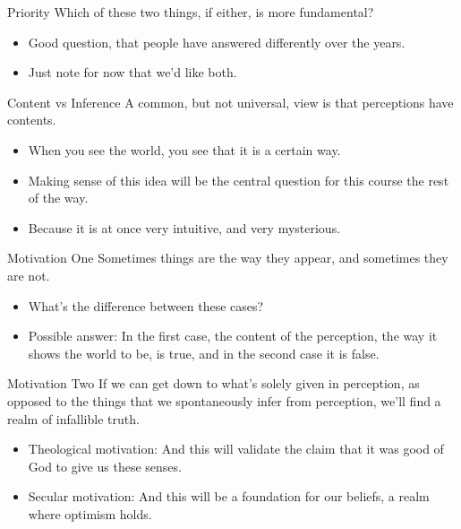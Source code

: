 \documentclass[
  17pt,
  letterpaper,
  ignorenonframetext,
  aspectratio=169,
  handout]{beamer}
\providecommand{\tightlist}{%
  \setlength{\itemsep}{0pt}\setlength{\parskip}{0pt}}\usepackage{longtable,booktabs,array}
\begin{document}
\begin{frame}{Priority}
\protect\hypertarget{priority}{}
Which of these two things, if either, is more fundamental?

\begin{itemize}[<+->]
\tightlist
\item
  Good question, that people have answered differently over the years.
\item
  Just note for now that we'd like both.
\end{itemize}
\end{frame}

\begin{frame}{Content vs Inference}
\protect\hypertarget{content-vs-inference}{}
A common, but not universal, view is that perceptions have contents.

\begin{itemize}[<+->]
\tightlist
\item
  When you see the world, you see that it is a certain way.
\item
  Making sense of this idea will be the central question for this course
  the rest of the way.
\item
  Because it is at once very intuitive, and very mysterious.
\end{itemize}
\end{frame}

\begin{frame}{Motivation One}
\protect\hypertarget{motivation-one}{}
Sometimes things are the way they appear, and sometimes they are not.

\begin{itemize}[<+->]
\tightlist
\item
  What's the difference between these cases?
\item
  Possible answer: In the first case, the content of the perception, the
  way it shows the world to be, is true, and in the second case it is
  false.
\end{itemize}
\end{frame}

\begin{frame}{Motivation Two}
\protect\hypertarget{motivation-two}{}
If we can get down to what's solely given in perception, as opposed to
the things that we spontaneously infer from perception, we'll find a
realm of infallible truth.

\begin{itemize}[<+->]
\tightlist
\item
  Theological motivation: And this will validate the claim that it was
  good of God to give us these senses.
\item
  Secular motivation: And this will be a foundation for our beliefs, a
  realm where optimism holds.
\end{itemize}
\end{frame}
\end{document}
